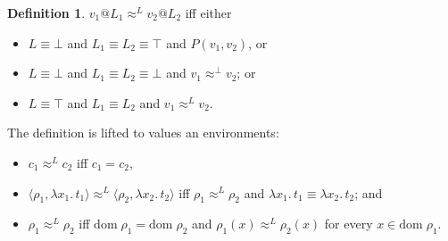 \documentclass{article}
\makeatletter
\newcommand{\at}{\ensuremath{{\scriptstyle{@}}}}
\theoremstyle{definition}
\newtheorem{definition}[theorem]{Definition}
\makeatother
\begin{document}
\begin{definition}
  $v_1 \at L_1 \approx^{L} v_2 \at L_2$ iff either
  \begin{itemize}
  \item $L \equiv \bot$ and
    $L_1 \equiv L_2 \equiv \top$ and $P(v_1, v_2)$, or
  \item $L \equiv \bot$ and
    $L_1 \equiv L_2 \equiv \bot$ and $v_1 \approx^{\bot} v_2$; or
  \item $L \equiv \top$ and $L_1 \equiv L_2$ and $v_1 \approx^{L} v_2$.
  \end{itemize}
  The definition is lifted to values an environments:
  \begin{itemize}
  \item $c_1 \approx^{L} c_2$ iff $c_1 = c_2$,
  \item
    $\langle{\rho_1, \lambda{x_1}.\, t_1\rangle} \approx^{L}
    \langle{\rho_2, \lambda{x_2}.\, t_2\rangle}$ iff
    $\rho_1 \approx^{L} \rho_2$ and
    $\lambda{x_1}.\, t_1 \equiv \lambda{x_2}.\, t_2$; and
  \item $\rho_1 \approx^{L} \rho_2$ iff
    $\mathrm{dom}\; \rho_1 = \mathrm{dom}\; \rho_2$ and
    $\rho_1(x) \approx^{L} \rho_2(x)$ for every
    $x \in \mathrm{dom}\; \rho_1$.
  \end{itemize}
\end{definition}
\end{document}
